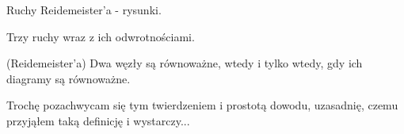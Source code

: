 \begin{definicja}
 Ruchy Reidemeister'a - rysunki.
\end{definicja}

Trzy ruchy wraz z ich odwrotnościami.

\begin{twierdzenie}{(Reidemeister'a)}
Dwa węzły są równoważne, wtedy i tylko wtedy, gdy ich diagramy są równoważne.
\end{twierdzenie}

Trochę pozachwycam się tym twierdzeniem i prostotą dowodu, uzasadnię, czemu przyjąłem taką definicję i wystarczy...
